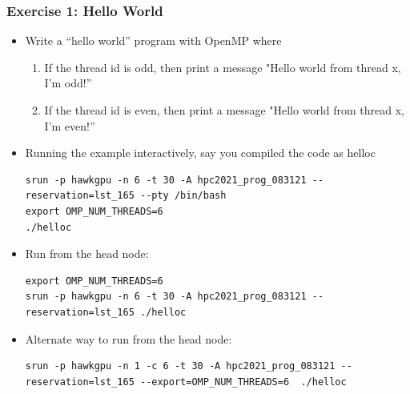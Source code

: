 \documentclass[10pt,t]{beamer}
\begin{document}
\begin{frame}[fragile]
  \frametitle{Exercise 1: Hello World}
  \begin{itemize}
    \item Write a ``hello world'' program with OpenMP where
      \begin{enumerate}
        \item If the thread id is odd, then print a message "Hello world from thread x, I'm odd!''
        \item If the thread id is even, then print a message "Hello world from thread x, I'm even!''
      \end{enumerate}
    \item Running the example interactively, say you compiled the code as helloc
	  \begin{lstlisting}[basicstyle=\footnotesize\ttfamily]
srun -p hawkgpu -n 6 -t 30 -A hpc2021_prog_083121 --reservation=lst_165 --pty /bin/bash
export OMP_NUM_THREADS=6
./helloc
           \end{lstlisting}
     \item Run from the head node: 
       \begin{lstlisting}[basicstyle=\footnotesize\ttfamily]
export OMP_NUM_THREADS=6
srun -p hawkgpu -n 6 -t 30 -A hpc2021_prog_083121 --reservation=lst_165 ./helloc
       \end{lstlisting}
     \item Alternate way to run from the head node: 
       \begin{lstlisting}[basicstyle=\footnotesize\ttfamily]
srun -p hawkgpu -n 1 -c 6 -t 30 -A hpc2021_prog_083121 --reservation=lst_165 --export=OMP_NUM_THREADS=6  ./helloc
       \end{lstlisting}
  \end{itemize}
%      
%      
\end{frame}
\end{document}
